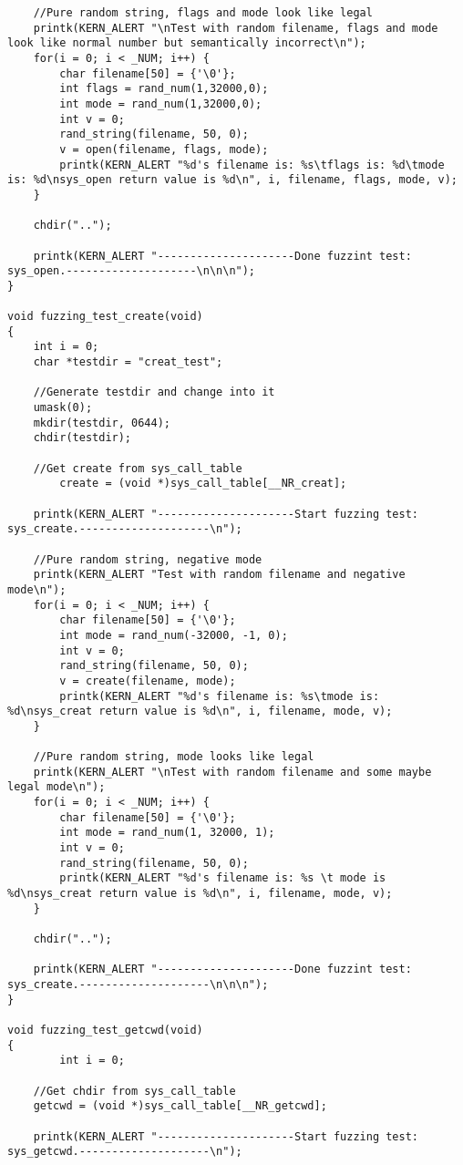 \documentclass[twoside]{article}
\begin{document}
\begin{lstlisting}
	//Pure random string, flags and mode look like legal
	printk(KERN_ALERT "\nTest with random filename, flags and mode look like normal number but semantically incorrect\n");
	for(i = 0; i < _NUM; i++) {
		char filename[50] = {'\0'};
		int flags = rand_num(1,32000,0);
		int mode = rand_num(1,32000,0);
		int v = 0;
		rand_string(filename, 50, 0);
		v = open(filename, flags, mode);
		printk(KERN_ALERT "%d's filename is: %s\tflags is: %d\tmode is: %d\nsys_open return value is %d\n", i, filename, flags, mode, v);
	}

	chdir("..");

	printk(KERN_ALERT "---------------------Done fuzzint test: sys_open.--------------------\n\n\n");
}

void fuzzing_test_create(void)
{
	int i = 0;
	char *testdir = "creat_test";

	//Generate testdir and change into it
	umask(0);
	mkdir(testdir, 0644);
	chdir(testdir);
	
	//Get create from sys_call_table
       	create = (void *)sys_call_table[__NR_creat];

	printk(KERN_ALERT "---------------------Start fuzzing test: sys_create.--------------------\n");

	//Pure random string, negative mode
	printk(KERN_ALERT "Test with random filename and negative mode\n");
	for(i = 0; i < _NUM; i++) {
		char filename[50] = {'\0'};
		int mode = rand_num(-32000, -1, 0);
		int v = 0;
		rand_string(filename, 50, 0);
		v = create(filename, mode);
		printk(KERN_ALERT "%d's filename is: %s\tmode is: %d\nsys_creat return value is %d\n", i, filename, mode, v);
	}

	//Pure random string, mode looks like legal
	printk(KERN_ALERT "\nTest with random filename and some maybe legal mode\n");
	for(i = 0; i < _NUM; i++) {
		char filename[50] = {'\0'};
		int mode = rand_num(1, 32000, 1);
		int v = 0;
		rand_string(filename, 50, 0);
		printk(KERN_ALERT "%d's filename is: %s \t mode is %d\nsys_creat return value is %d\n", i, filename, mode, v);
	}

	chdir("..");
	
	printk(KERN_ALERT "---------------------Done fuzzint test: sys_create.--------------------\n\n\n");
}

void fuzzing_test_getcwd(void)
{
       	int i = 0;

	//Get chdir from sys_call_table
	getcwd = (void *)sys_call_table[__NR_getcwd];

	printk(KERN_ALERT "---------------------Start fuzzing test: sys_getcwd.--------------------\n");


\end{lstlisting}
\end{document}
